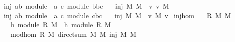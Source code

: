 \begin{isabellebody}
\ inj{}{\isacharcolon}{\isacharcolon}\ {\isachardoublequoteopen}{\isacharparenleft}{\isacharprime}a{\isacharcomma}{\isacharprime}b{\isacharparenright}\ module\ {\isasymRightarrow}\ {\isacharparenleft}{\isacharprime}a{\isacharcomma}\ {\isacharprime}c{\isacharparenright}\ module\ {\isasymRightarrow}{\isacharparenleft}{\isacharprime}b{\isasymRightarrow}{\isacharparenleft}{\isacharprime}b{\isasymtimes}{\isacharprime}c{\isacharparenright}{\isacharparenright}{\isachardoublequoteclose}\isanewline
\ \ \ {\isachardoublequoteopen}inj{}\ M{}\ M{}\ {\isacharequal}\ {\isacharparenleft}{\isasymlambda}v{\isachardot}\ {\isacharparenleft}v{\isacharcomma}\ {\isasymzero}\isactrlbsub M{}\isactrlesub {\isacharparenright}{\isacharparenright}{\isachardoublequoteclose}\isanewline
\isanewline
{}\isamarkupfalse%
\ inj{}{\isacharcolon}{\isacharcolon}\ {\isachardoublequoteopen}{\isacharparenleft}{\isacharprime}a{\isacharcomma}{\isacharprime}b{\isacharparenright}\ module\ {\isasymRightarrow}\ {\isacharparenleft}{\isacharprime}a{\isacharcomma}\ {\isacharprime}c{\isacharparenright}\ module\ {\isasymRightarrow}{\isacharparenleft}{\isacharprime}c{\isasymRightarrow}{\isacharparenleft}{\isacharprime}b{\isasymtimes}{\isacharprime}c{\isacharparenright}{\isacharparenright}{\isachardoublequoteclose}\isanewline
\ \ \ {\isachardoublequoteopen}inj{}\ M{}\ M{}\ {\isacharequal}\ {\isacharparenleft}{\isasymlambda}v{\isachardot}\ {\isacharparenleft}{\isasymzero}\isactrlbsub M{}\isactrlesub {\isacharcomma}\ v{\isacharparenright}{\isacharparenright}{\isachardoublequoteclose}\isanewline
\isanewline
{}\isamarkupfalse%
\ inj{}{\isacharunderscore}hom{\isacharcolon}\isanewline
\ \ \ R\ M{}\ M{}\isanewline
\ \ \ h{}{\isacharcolon}\ {\isachardoublequoteopen}module\ R\ M{}{\isachardoublequoteclose}\ \ h{}{\isacharcolon}\ {\isachardoublequoteopen}module\ R\ M{}{\isachardoublequoteclose}\isanewline
\ \ \ {\isachardoublequoteopen}mod{\isacharunderscore}hom\ R\ M{}\ {\isacharparenleft}direct{\isacharunderscore}sum\ M{}\ M{}{\isacharparenright}\ {\isacharparenleft}inj{}\ M{}\ M{}{\isacharparenright}{\isachardoublequoteclose}\isanewline
%
\isadelimproof
%
\endisadelimproof
%
\isatagproof
{}\isamarkupfalse%

\end{isabellebody}
